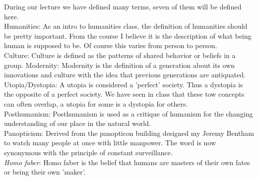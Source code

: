 During our lecture we have defined many terms, seven of them will be defined here.\\
Humanities: As an intro to humanities class, the definition of humanities should be pretty important. From the course I believe it is the description of what being human is supposed to be. Of course this varies from person to person.\\
Culture: Culture is defined as the patterns of shared behavior or beliefs in a group. 
Modernity: Modernity is the definition of a generation about its own innovations and culture with the idea that previous generations are antiquated.\\
Utopia/Dystopia: A utopia is considered a 'perfect' society. Thus a dystopia is the opposite of a perfect society. We have seen in class that these tow concepts can often overlap, a utopia for some is a dystopia for others.\\
Posthumanism: Posthumanism is used as a critique of humanism for the changing understanding of our place in the natural world.\\
Panopticism: Derived from the panopticon building designed my Jeremy Bentham to watch many people at once with little manpower. The word is now synonymous with the principle of constant surveillance.\\
\textit{Homo faber}: Homo faber is the belief that humans are masters of their own fates or being their own 'maker'.
